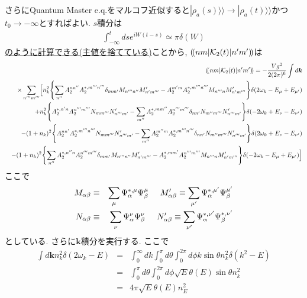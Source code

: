 \documentclass[10.5pt,a4paper]{jreport}
\newcommand{\dket}[1]{| #1 \rangle \! \rangle}
\newcommand{\dpbra}[1]{( \! ( #1 |}
\newcommand{\dpket}[1]{| #1 ) \! )}
\newcommand{\calK}{{\cal K}}
\begin{document}
さらにQuantum Master e.q.をマルコフ近似すると$\dket{\rho_a(s)}\rightarrow\dket{\rho_a(t)}$かつ$t_0\rightarrow -\infty$とすればよい. $s$積分は
\begin{eqnarray}
  \int_{-\infty}^t ds e^{iW(t-s)} \simeq \pi\delta(W)
\end{eqnarray}
\underline{のように計算できる(主値を捨てている)}ことから, $\dpbra{nm}\calK_2(t)\dpket{n'm'}$は
\begin{eqnarray}
  &&\dpbra{nm}\calK_2(t)\dpket{n'm'} = -\frac{Vg^2}{2(2\pi)^6}\int d\bm{k}\\
  \nonumber  &&\times\sum_{n'''m'''}\Bigl[ n_k^2\Bqty{\sum_{n''}A_2^{nn''}A_2^{*, m'''n'''}\delta_{mm'}M_{n'''n''}M_{n'm'''}' - A_2^{m'm}A_2^{*, m'''n'''}M_{n'''n}M_{n'm'''}'}\delta(2\omega_k - E_\mu + E_{\mu'})\\
    \nonumber &&\ \ + n_k^2\Bqty{A_2^{*, n'n}A_2^{n'''m'''}N_{mm'''}N_{n'''m'}' - \sum_{m''}A_2^{*, mm''}A_2^{n'''m'''}\delta_{nn'}N_{m''m'''}N_{n'''m'}'}\delta(-2\omega_k + E_\nu - E_{\nu'})\\
    \nonumber &&- (1 + n_k)^2\Bqty{A_2^{nn'}A_2^{*, m'''n'''}N_{mm'''}N_{n'''m'}' - \sum_{m''}A_2^{m''m}A_2^{*, m'''n'''}\delta_{nn'}N_{m''m'''}N_{n'''m'}'}\delta(2\omega_k + E_\nu - E_{\nu'})\\
   \nonumber&&-(1+n_k)^2\Bqty{\sum_{n''}A_2^{*, n''n}A_2^{n'''m'''}\delta_{mm'}M_{n'''n''}M_{n'm'''}' - A_2^{*, mm'}A_2^{n'''m'''}M_{n'''n}M_{n'm'''}'}\delta(-2\omega_k - E_\mu + E_{\mu'})\Bigr]\\
\end{eqnarray}
ここで
\begin{eqnarray}
  M_{\alpha\beta} &\equiv& \sum_\mu \Psi_\alpha^{*, \mu}\Psi_\beta^{\mu}\hspace{0.5cm}M_{\alpha\beta}' \equiv \sum_{\mu'} \Psi_\alpha^{*, \mu'}\Psi_\beta^{\mu'}\\
    N_{\alpha\beta} &\equiv& \sum_\nu \Psi_\alpha^{\nu}\Psi_\beta^{\nu}\hspace{0.5cm}N_{\alpha\beta}' \equiv \sum_{\nu'} \Psi_\alpha^{*, \nu'}\Psi_\beta^{*, \nu'}
\end{eqnarray}
としている. さらに$\bm{k}$積分を実行する. ここで
\begin{eqnarray}
  \int d\bm{k} n_k^2\delta(2\omega_k - E) &=& \int_0^\infty dk\int_0^\pi d\theta \int_0^{2\pi}d\phi k\sin{\theta}n_k^2\delta(k^2 - E) \\
  &=& \int_0^\pi d\theta \int_0^{2\pi}d\phi \sqrt{E}\theta(E)\sin{\theta}n_k^2\\
  &=& 4\pi\sqrt{E}\theta(E)n_E^2
\end{eqnarray}
\end{document}

